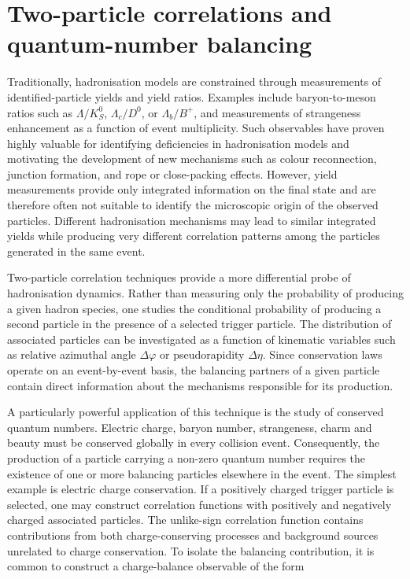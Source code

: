 \section{Two-particle correlations and quantum-number balancing}
\label{Sec:Observables}

Traditionally, hadronisation models are constrained through measurements of identified-particle yields and yield ratios. Examples include baryon-to-meson ratios such as $\Lambda/K^0_S$, $\Lambda_c/D^0$, or $\Lambda_b/B^+$, and measurements of strangeness enhancement as a function of event multiplicity. Such observables have proven highly valuable for identifying deficiencies in hadronisation models and motivating the development of new mechanisms such as colour reconnection, junction formation, and rope or close-packing effects. However, yield measurements provide only integrated information on the final state and are therefore often not suitable to identify the microscopic origin of the observed particles. Different hadronisation mechanisms may lead to similar integrated yields while producing very different correlation patterns among the particles generated in the same event.

Two-particle correlation techniques provide a more differential probe of hadronisation dynamics. Rather than measuring only the probability of producing a given hadron species, one studies the conditional probability of producing a second particle in the presence of a selected trigger particle. The distribution of associated particles can be investigated as a function of kinematic variables such as relative azimuthal angle $\Delta\varphi$ or pseudorapidity $\Delta\eta$. Since conservation laws operate on an event-by-event basis, the balancing partners of a given particle contain direct information about the mechanisms responsible for its production.

A particularly powerful application of this technique is the study of conserved quantum numbers. Electric charge, baryon number, strangeness, charm and beauty must be conserved globally in every collision event. Consequently, the production of a particle carrying a non-zero quantum number requires the existence of one or more balancing particles elsewhere in the event. The simplest example is electric charge conservation. If a positively charged trigger particle is selected, one may construct correlation functions with positively and negatively charged associated particles. The unlike-sign correlation function contains contributions from both charge-conserving processes and background sources unrelated to charge conservation. To isolate the balancing contribution, it is common to construct a charge-balance observable of the form

